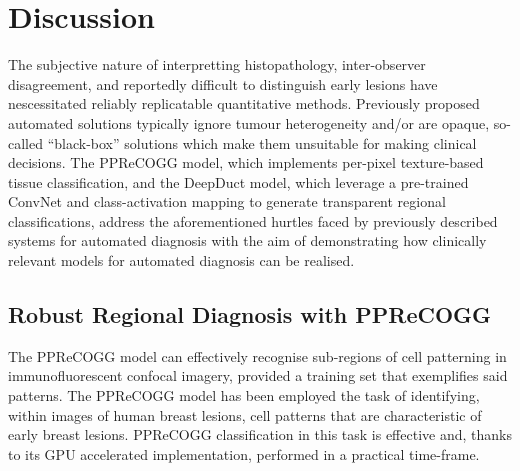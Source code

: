 \chapter{Discussion}


The subjective nature of interpretting histopathology, inter-observer disagreement, and reportedly difficult to distinguish early lesions have nescessitated reliably replicatable quantitative methods. Previously proposed automated solutions typically ignore tumour heterogeneity and/or are opaque, so-called ``black-box'' solutions which make them unsuitable for making clinical decisions. The PPReCOGG model, which implements per-pixel texture-based tissue classification, and the DeepDuct model, which leverage a pre-trained ConvNet and class-activation mapping to generate transparent regional classifications, address the aforementioned hurtles faced by previously described systems for automated diagnosis with the aim of demonstrating how clinically relevant models for automated diagnosis can be realised.

\section{Robust Regional Diagnosis with PPReCOGG}

The PPReCOGG model can effectively recognise sub-regions of cell patterning in immunofluorescent confocal imagery, provided a training set that exemplifies said patterns. The PPReCOGG model has been employed the task of identifying, within images of human breast lesions, cell patterns that are characteristic of early breast lesions. PPReCOGG classification in this task is effective and, thanks to its GPU accelerated implementation, performed in a practical time-frame.\par

